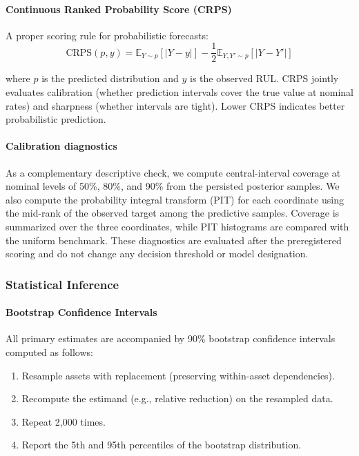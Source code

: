 \paragraph{Continuous Ranked Probability Score (CRPS)}
A proper scoring rule for probabilistic forecasts:
\[
\text{CRPS}(p, y) = \mathbb{E}_{Y \sim p}[|Y - y|] - \frac{1}{2} \mathbb{E}_{Y, Y' \sim p}[|Y - Y'|]
\]

where $p$ is the predicted distribution and $y$ is the observed RUL. CRPS jointly evaluates calibration (whether prediction intervals cover the true value at nominal rates) and sharpness (whether intervals are tight). Lower CRPS indicates better probabilistic prediction.

\paragraph{Calibration diagnostics}
As a complementary descriptive check, we compute central-interval coverage at nominal levels of 50\%, 80\%, and 90\% from the persisted posterior samples. We also compute the probability integral transform (PIT) for each coordinate using the mid-rank of the observed target among the predictive samples. Coverage is summarized over the three coordinates, while PIT histograms are compared with the uniform benchmark. These diagnostics are evaluated after the preregistered scoring and do not change any decision threshold or model designation.

\subsubsection{Statistical Inference}

\paragraph{Bootstrap Confidence Intervals}
All primary estimates are accompanied by 90\% bootstrap confidence intervals computed as follows:
\begin{enumerate}
    \item Resample assets with replacement (preserving within-asset dependencies).
    \item Recompute the estimand (e.g., relative reduction) on the resampled data.
    \item Repeat 2,000 times.
    \item Report the 5th and 95th percentiles of the bootstrap distribution.
\end{enumerate}

